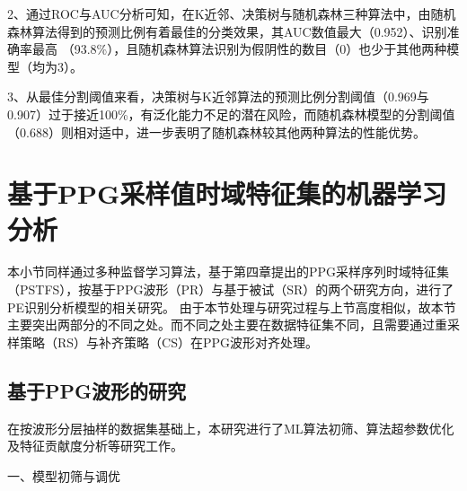 2、通过ROC与AUC分析可知，在K近邻、决策树与随机森林三种算法中，由随机森林算法得到的预测比例有着最佳的分类效果，其AUC数值最大（0.952）、识别准确率最高
（93.8\%），且随机森林算法识别为假阴性的数目（0）也少于其他两种模型（均为3）。

3、从最佳分割阈值来看，决策树与K近邻算法的预测比例分割阈值（0.969与0.907）过于接近100\%，有泛化能力不足的潜在风险，而随机森林模型的分割阈值（0.688）则相对适中，进一步表明了随机森林较其他两种算法的性能优势。

\section{基于PPG采样值时域特征集的机器学习分析}
本小节同样通过多种监督学习算法，基于第四章提出的PPG采样序列时域特征集（PSTFS），按基于PPG波形（PR）与基于被试（SR）的两个研究方向，进行了PE识别分析模型的相关研究。
由于本节处理与研究过程与上节高度相似，故本节主要突出两部分的不同之处。而不同之处主要在数据特征集不同，且需要通过重采样策略（RS）与补齐策略（CS）在PPG波形对齐处理。

\subsection{基于PPG波形的研究}

在按波形分层抽样的数据集基础上，本研究进行了ML算法初筛、算法超参数优化及特征贡献度分析等研究工作。

一、模型初筛与调优

